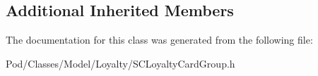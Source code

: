 \subsection*{Additional Inherited Members}


The documentation for this class was generated from the following file\+:\begin{DoxyCompactItemize}
\item 
Pod/\+Classes/\+Model/\+Loyalty/S\+C\+Loyalty\+Card\+Group.\+h\end{DoxyCompactItemize}
